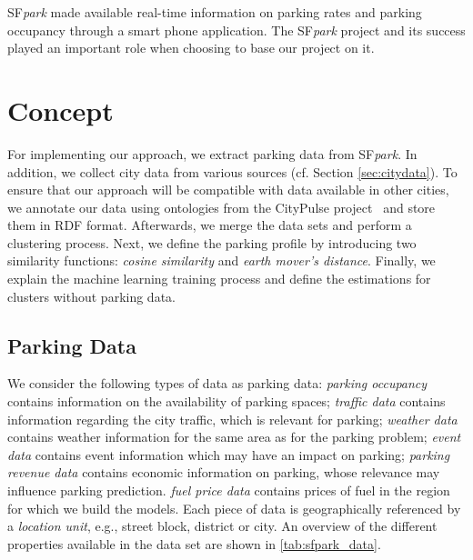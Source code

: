 SF\textit{park} made available real-time information on parking rates and parking occupancy through a smart phone application. The SF\textit{park} project and its success played an important role when choosing to base our project on it.

\section{Concept}
For implementing our approach, we extract parking data from SF\textit{park}. In addition, we collect city data from various sources (cf. Section \ref{sec:citydata}). To ensure that our approach will be compatible with data available in other cities, we annotate our data using ontologies from the CityPulse project~\cite{city_pulse} and store them in RDF format. Afterwards, we merge the data sets and perform a clustering process. Next, we define the parking profile by introducing two similarity functions: \textit{cosine similarity} and \textit{earth mover's distance}.
Finally, we explain the machine learning training process and define the estimations for clusters without parking data.


\subsection{Parking Data}
We consider the following types of data as parking data: \textit{parking occupancy} contains information on the availability of parking spaces; \textit{traffic data} contains information regarding the city traffic, which is relevant for parking; \textit{weather data} contains weather information for the same area as for the parking problem; \textit{event data} contains event information which may have an impact on parking; \textit{parking revenue data} contains economic information on parking, whose relevance may influence parking prediction. \textit{fuel price data} contains prices of fuel in the region for which we build the models.
Each piece of data is geographically referenced by a \textit{location unit}, e.g., street block, district or city. 
An overview of the different properties available in the data set are shown in \ref{tab:sfpark_data}.

